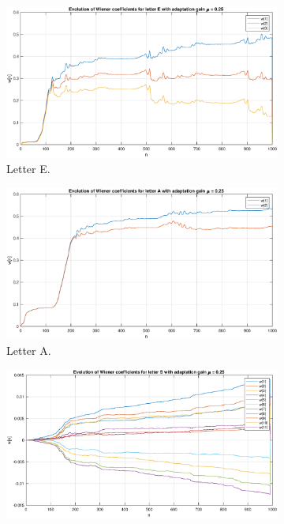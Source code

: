 \begin{figure}[H]
\begin{subfigure}{.32\textwidth}
  \centering
  \includegraphics[width=\linewidth]{assignment4figs/wienerE.eps}  
  \caption{Letter E.}
\end{subfigure}
\begin{subfigure}{.32\textwidth}
  \centering
  \includegraphics[width=\linewidth]{assignment4figs/wienerA.eps}  
  \caption{Letter A.}
\end{subfigure}
\begin{subfigure}{.32\textwidth}
  \centering
  \includegraphics[width=\linewidth]{assignment4figs/wienerS.eps}  

\end{subfigure}
\end{figure}
